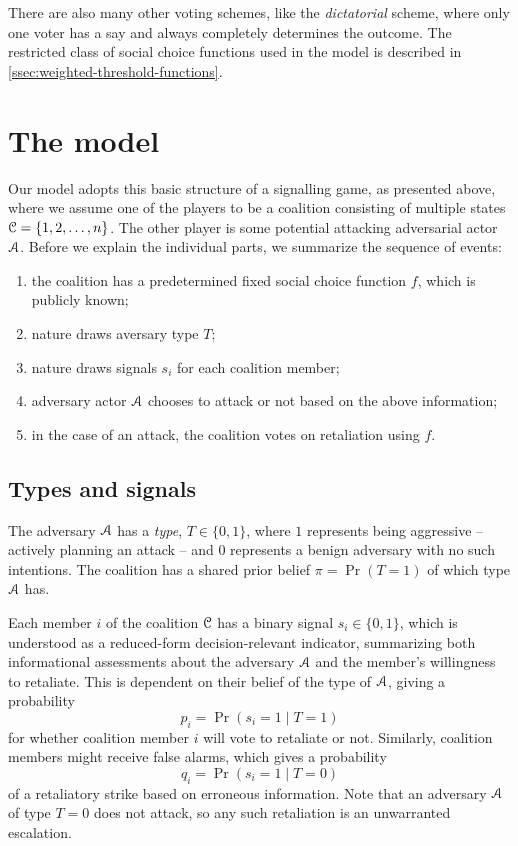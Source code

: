 There are also many other voting schemes, like the \emph{dictatorial} scheme, where only one voter has a say and always completely determines the outcome. The restricted class of social choice functions used in the model is described in \cref{ssec:weighted-threshold-functions}. 

\section{The model}
\label{sec:the-model}
Our model adopts this basic structure of a signalling game, as presented above, where we assume one of the players to be a coalition consisting of multiple states $\EuScript{C} = \{1, 2, \dots, n\}$. The other player is some potential attacking adversarial actor $\EuScript{A}$. Before we explain the individual parts, we summarize the sequence of events: 
\begin{enumerate}
    \item the coalition has a predetermined fixed social choice function $f$, which is publicly known;
    \item nature draws aversary type $T$;
    \item nature draws signals $s_i$ for each coalition member;
    \item adversary actor $\EuScript{A}$ chooses to attack or not based on the above information;
    \item in the case of an attack, the coalition votes on retaliation using $f$. 
\end{enumerate}


\subsection{Types and signals}
The adversary $\EuScript{A}$ has a \emph{type}, $T \in \{0,1\}$, where $1$ represents being aggressive -- actively planning an attack -- and $0$ represents a benign adversary with no such intentions. The coalition has a shared prior belief $\pi = \Pr(T=1)$ of which type $\EuScript{A}$ has. 

Each member $i$ of the coalition $\EuScript{C}$ has a binary signal $s_i \in \{0,1\}$, which is understood as a reduced-form decision-relevant indicator, summarizing both informational assessments about the adversary $\EuScript{A}$ and the member's willingness to retaliate. This is dependent on their belief of the type of $\EuScript{A}$, giving a probability
\[p_i = \Pr(s_i = 1 \mid T=1)\]
for whether coalition member $i$ will vote to retaliate or not. Similarly, coalition members might receive false alarms, which gives a probability
\[q_i = \Pr(s_i = 1 \mid T=0)\]
of a retaliatory strike based on erroneous information. Note that an adversary $\EuScript{A}$ of type $T=0$ does not attack, so any such retaliation is an unwarranted escalation. 

